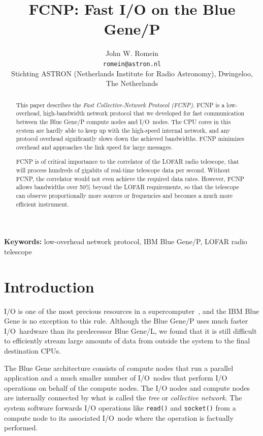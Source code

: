 \documentclass[conference]{worldcomp}
\title{FCNP: Fast I/O on the Blue Gene/P}
\author{John W. Romein \\[3mm]
\texttt{romein@astron.nl}\\
Stichting ASTRON (Netherlands Institute for Radio Astronomy), Dwingeloo, The Netherlands}
\begin{document}
\maketitle

\begin{abstract}
This paper describes the \emph{Fast Collective-Network Protocol (FCNP)}.
FCNP is a low-overhead, high-bandwidth network protocol that we developed for
fast communication between the Blue Gene/P compute nodes and I/O~nodes.
The CPU cores in this system are hardly able to keep up with the high-speed
internal network, and any protocol overhead significantly slows down the
achieved bandwidths.
FCNP minimizes overhead and approaches the link speed for large messages.

FCNP is of critical importance to the correlator of the LOFAR radio telescope,
that will process hundreds of gigabits of real-time telescope data per second.
Without FCNP, the correlator would not even achieve the required data rates.
However, FCNP allows bandwidths over 50\% beyond the LOFAR requirements,
so that the telescope can observe proportionally more sources or frequencies
and becomes a much more efficient instrument.
\end{abstract}

\vspace{1em}\noindent
\textbf{Keywords:} {\small low-overhead network protocol, IBM Blue Gene/P, LOFAR radio telescope}


\section{Introduction}

I/O is one of the most precious resources in a supercomputer~\cite{Iskra:08},
and the IBM Blue Gene is no exception to this rule.
Although the Blue Gene/P uses much faster I/O~hardware than
its predecessor Blue Gene/L, we found that it is still difficult to
efficiently stream large amounts of data from outside the system to the
final destination CPUs.

The Blue Gene architecture consists of compute nodes that run a parallel
application and a much smaller number of I/O~nodes that perform
I/O operations on behalf of the compute nodes.
The I/O nodes and compute nodes are internally connected by what is called the
\emph{tree\/} or \emph{collective network}.
The system software forwards I/O operations like \texttt{read()} and
\texttt{socket()} from a compute node to its associated I/O~node where the
operation is factually performed.
\end{document}
